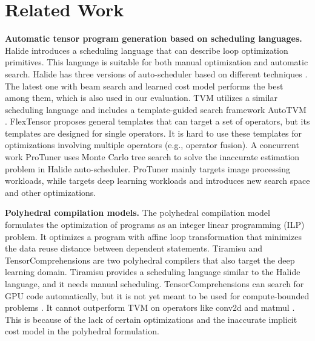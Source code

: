 
\section{Related Work}
\label{sec:related-work}


\textbf{Automatic tensor program generation based on scheduling languages.}
Halide \cite{ragan2013halide} introduces a scheduling language that can describe loop optimization primitives. This language is suitable for both manual optimization and automatic search. Halide has three versions of auto-scheduler based on different techniques \cite{mullapudi2016automatically,li2018differentiable,adams2019learning}. The latest one with beam search and learned cost model performs the best among them, which is also used in our evaluation.
TVM \cite{chen2018tvm} utilizes a similar scheduling language and includes a template-guided search framework
AutoTVM \cite{chen2018learning}.
FlexTensor\cite{zheng2020flextensor} proposes general templates that can target a set of operators,
but its templates are designed for single operators. It is hard to use these templates for optimizations involving multiple operators  (e.g., operator fusion).
A concurrent work ProTuner \cite{haj2020protuner} uses Monte Carlo tree search to solve the inaccurate estimation problem in Halide auto-scheduler. ProTuner mainly targets image processing workloads, while \Ansor targets deep learning workloads and introduces new search space and other optimizations. 

\textbf{Polyhedral compilation models.} The polyhedral compilation model \cite{bondhugula2008practical,verdoolaege2013polyhedral,verdoolaege2016presburger} formulates the optimization of programs as an integer linear programming (ILP) problem.
It optimizes a program with affine loop transformation that minimizes the data reuse distance between dependent statements. 
Tiramisu \cite{baghdadi2019tiramisu} and TensorComprehensions \cite{vasilache2018tensor} are two polyhedral compilers that also target the deep learning domain.
Tiramisu provides a scheduling language similar to the Halide language, and it needs manual scheduling.
TensorComprehensions can search for GPU code automatically,
but it is not yet meant to be used for compute-bounded problems \cite{chen2018tvm}. It cannot outperform TVM on operators like conv2d and matmul \cite{chen2018tvm, tillet2019triton}. 
This is because of the lack of certain optimizations \cite{vasilache2019next} and the inaccurate implicit cost model in the polyhedral formulation.

